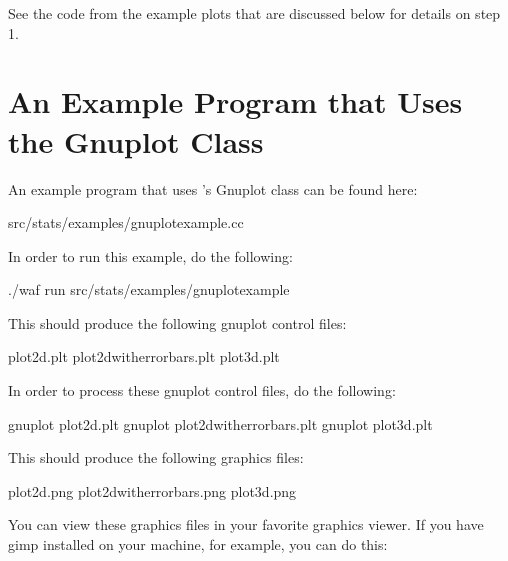 \documentclass[letterpaper,10pt,english]{sphinxmanual}
\begin{document}
See the code from the example plots that are discussed below for details on step 1.


\section{An Example Program that Uses the Gnuplot Class}
\label{\detokenize{gnuplot:an-example-program-that-uses-the-gnuplot-class}}
An example program that uses ’s Gnuplot class can be found here:

\begin{sphinxVerbatim}[commandchars=\\\{\}]
src/stats/examples/gnuplot\PYGZhy{}example.cc
\end{sphinxVerbatim}

In order to run this example, do the following:

\begin{sphinxVerbatim}[commandchars=\\\{\}]
\PYGZdl{} ./waf \PYGZhy{}\PYGZhy{}run src/stats/examples/gnuplot\PYGZhy{}example
\end{sphinxVerbatim}

This should produce the following gnuplot control files:

\begin{sphinxVerbatim}[commandchars=\\\{\}]
plot\PYGZhy{}2d.plt
plot\PYGZhy{}2d\PYGZhy{}with\PYGZhy{}error\PYGZhy{}bars.plt
plot\PYGZhy{}3d.plt
\end{sphinxVerbatim}

In order to process these gnuplot control files, do the following:

\begin{sphinxVerbatim}[commandchars=\\\{\}]
\PYGZdl{} gnuplot plot\PYGZhy{}2d.plt
\PYGZdl{} gnuplot plot\PYGZhy{}2d\PYGZhy{}with\PYGZhy{}error\PYGZhy{}bars.plt
\PYGZdl{} gnuplot plot\PYGZhy{}3d.plt
\end{sphinxVerbatim}

This should produce the following graphics files:

\begin{sphinxVerbatim}[commandchars=\\\{\}]
plot\PYGZhy{}2d.png
plot\PYGZhy{}2d\PYGZhy{}with\PYGZhy{}error\PYGZhy{}bars.png
plot\PYGZhy{}3d.png
\end{sphinxVerbatim}

You can view these graphics files in your favorite graphics viewer.  If you have gimp installed on your machine, for example, you can do this:
\end{document}
